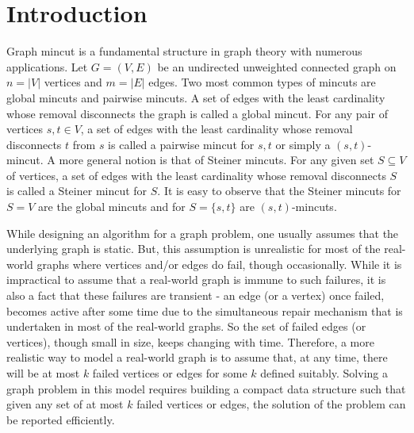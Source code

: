 \chapter{Introduction}

Graph mincut is a fundamental structure in graph theory with numerous applications. Let $G=(V,E)$ be an undirected unweighted connected graph on $n=|V|$ vertices and $m=|E|$ edges.
Two most common types of mincuts are global mincuts and pairwise mincuts. A set of edges with the least cardinality whose removal disconnects the graph is called a global mincut. For any pair of vertices $s,t\in V$, 
a set of edges with the least cardinality whose removal disconnects $t$ from $s$ is called a pairwise mincut for $s,t$ or simply a $(s,t)$-mincut. A more general notion is that of Steiner mincuts. For any given set $S\subseteq V$ of vertices, a set of edges with the least cardinality whose removal disconnects $S$ is called a Steiner mincut for $S$. It is easy to observe that the Steiner mincuts for $S=V$ are the global mincuts and for $S=\{s,t\}$ are $(s,t)$-mincuts.

While designing an algorithm for a graph problem, one usually assumes that the underlying graph is static. But, this assumption is unrealistic for most of the real-world graphs where vertices and/or edges do fail, though occasionally. While it is impractical to assume that a real-world graph is immune to such failures, it is also a fact that these failures are transient - an edge (or a vertex) once failed, becomes active after some time due to the simultaneous repair mechanism that is undertaken in most of the real-world graphs. So the set of failed edges (or vertices), though small in size, keeps changing with time. Therefore, a more realistic way to model a real-world graph is to assume that, at any time, there will be at most $k$ failed vertices or edges for some $k$ defined suitably. Solving a graph problem in this model requires building a compact data structure such that given any set of at most $k$ failed vertices or edges, the solution of the problem can be reported efficiently.


